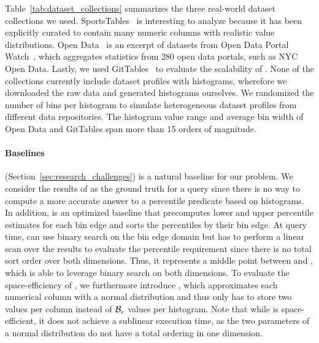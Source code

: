 Table~\ref{tab:dataset_collections} summarizes the three real-world dataset collections we used.
Sports\-Tables~\cite{langenecker_sportstables_2023} is interesting to analyze because it has been explicitly curated to contain many numeric columns with realistic value distributions.
Open Data~\cite{galhotra_metam_2023} is an excerpt of datasets from Open Data Portal Watch~\cite{neumaier_automated_2016}, which aggregates statistics from 280 open data portals, such as NYC Open Data.
Lastly, we used GitTables~\cite{hulsebos_gittables_2023} to evaluate the scalability of \system{}.
None of the collections currently include dataset profiles with histograms, wherefore we downloaded the raw data and generated histograms ourselves.
We randomized the number of bins per histogram to simulate heterogeneous dataset profiles from different data repositories.
The histogram value range and average bin width of Open Data and GitTables span more than 15 orders of magnitude.

\paragraph{Baselines}
\pscan (Section~\ref{sec:research_challenges}) is a natural baseline for our problem.
We consider the results of \pscan as the ground truth for a query since there is no way to compute a more accurate answer to a percentile predicate based on histograms.
In addition, \binsort is an optimized baseline that precomputes lower and upper percentile estimates for each bin edge and sorts the percentiles by their bin edge.
At query time, \binsort can use binary search on the bin edge domain but has to perform a linear scan over the results to evaluate the percentile requirement since there is no total sort order over both dimensions.
Thus, it represents a middle point between \pscan and \system{}, which is able to leverage binary search on both dimensions.
To evaluate the space-efficiency of \system{}, we furthermore introduce \ndist, which approximates each numerical column with a normal distribution and thus only has to store two values per column instead of $\mathcal{B}_c$ values per histogram.
Note that while \ndist is space-efficient, it does not achieve a sublinear execution time, as the two parameters of a normal distribution do not have a total ordering in one dimension.

